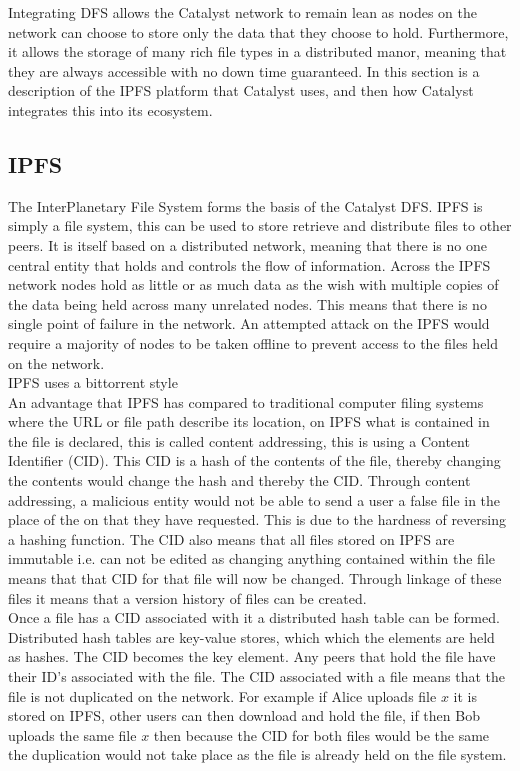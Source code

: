 \documentclass{article}
\begin{document}
Integrating DFS allows the Catalyst network to remain lean as nodes on the network can choose to store only the data that they choose to hold. Furthermore, it allows the storage of many rich file types in a distributed manor, meaning that they are always accessible with no down time guaranteed. In this section is a description of the IPFS platform that Catalyst uses, and then how Catalyst integrates this into its ecosystem. 


\subsection{IPFS}

The InterPlanetary File System forms the basis of the Catalyst DFS. IPFS is simply a file system, this can be used to store retrieve and distribute files to other peers. It is itself based on a distributed network, meaning that there is no one central entity that holds and controls the flow of information. Across the IPFS network nodes hold as little or as much data as the wish with multiple copies of the data being held across many unrelated nodes. This means that there is no single point of failure in the network. An attempted attack on the IPFS would require a majority of nodes to be taken offline to prevent access to the files held on the network.   \\

IPFS uses a bittorrent style \\

An advantage that IPFS has compared to traditional computer filing systems where the URL or file path describe its location, on IPFS what is contained in the file is declared, this is called content addressing, this is using a Content Identifier (CID). This CID is a hash of the contents of the file, thereby changing the contents would change the hash and thereby the CID. Through content addressing, a malicious entity would not be able to send a user a false file in the place of the on that they have requested. This is due to the hardness of reversing a hashing function. The CID also means that all files stored on IPFS are immutable i.e. can not be edited as changing anything contained within the file means that that CID for that file will now be changed. Through linkage of these files it means that a version history of files can be created. \\

Once a file has a CID associated with it a distributed hash table can be formed. Distributed hash tables are key-value stores, which which the elements are held as hashes. The CID becomes the key element. Any peers that hold the file have their ID's associated with the file. The CID associated with a file means that the file is not duplicated on the network. For example if Alice uploads file $x$ it is stored on IPFS, other users can then download and hold the file, if then Bob uploads the same file $x$ then because the CID for both files would be the same the duplication would not take place as the file is already held on the file system.  \\
\end{document}
